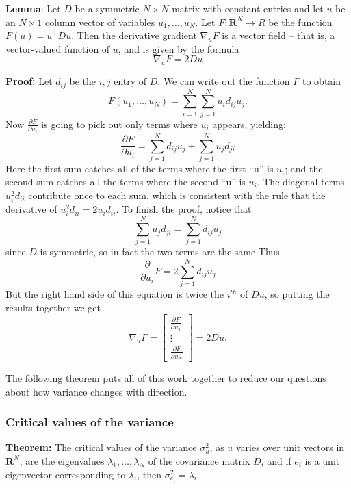 \documentclass[
]{article}
\begin{document}
\textbf{Lemma}: Let \(D\) be a symmetric \(N\times N\) matrix with
constant entries and let \(u\) be an \(N\times 1\) column vector of
variables \(u_{1},\ldots, u_{N}\). Let \(F:\mathbf{R}^{N}\to R\) be the
function \(F(u) = u^{\intercal}Du\). Then the derivative gradient
\(\nabla_{u} F\) is a vector field -- that is, a vector-valued function
of \(u\), and is given by the formula \[
\nabla_{u} F = 2Du
\]

\textbf{Proof:} Let \(d_{ij}\) be the \(i,j\) entry of \(D\). We can
write out the function \(F\) to obtain \[
F(u_1,\ldots, u_{N}) = \sum_{i=1}^{N} \sum_{j=1}^{N} u_i d_{ij} u_j.
\] Now \(\frac{\partial F}{\partial u_{i}}\) is going to pick out only
terms where \(u_{i}\) appears, yielding: \[
\frac{\partial F}{\partial u_{i}} = \sum_{j=1}^{N} d_{ij}u_{j} + \sum_{j=1}^{N} u_{j}d_{ji}
\] Here the first sum catches all of the terms where the first ``u'' is
\(u_{i}\); and the second sum catches all the terms where the second
``u'' is \(u_{i}\). The diagonal terms \(u_{i}^2d_{ii}\) contribute once
to each sum, which is consistent with the rule that the derivative of
\(u_{i}^2d_{ii} = 2u_{i}d_{ii}\). To finish the proof, notice that \[
\sum_{j=1}^{N} u_{j}d_{ji} = \sum_{j=1}^{N} d_{ij}u_{j} 
\] since \(D\) is symmetric, so in fact the two terms are the same Thus
\[
\frac{\partial}{\partial u_{i}}F = 2\sum_{j=1}^{N} d_{ij}u_{j}
\] But the right hand side of this equation is twice the \(i^{th}\) of
\(Du\), so putting the results together we get \[
\nabla_{u}F = \left[\begin{matrix} \frac{\partial F}{\partial u_{1}} \\ \vdots \\ \frac{\partial F}{\partial u_{N}}\end{matrix}\right] = 2Du.
\]

The following theorem puts all of this work together to reduce our
questions about how variance changes with direction.

\hypertarget{sec:critvals}{%
\subsubsection{Critical values of the variance}\label{sec:critvals}}

\textbf{Theorem:} The critical values of the variance \(\sigma_{u}^2\),
as \(u\) varies over unit vectors in \(\mathbf{R}^{N}\), are the
eigenvalues \(\lambda_{1},\ldots,\lambda_{N}\) of the covariance matrix
\(D\), and if \(e_{i}\) is a unit eigenvector corresponding to
\(\lambda_{i}\), then \(\sigma_{e_{i}}^2 = \lambda_{i}\).
\end{document}
